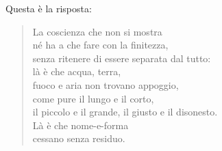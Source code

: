 Questa è la risposta:

\begin{quote}

\label{pag167}%
La coscienza che non si mostra \\
né ha a che fare con la finitezza, \\
senza ritenere di essere separata dal tutto: \\
là è che acqua, terra, \\
fuoco e aria non trovano appoggio, \\
come pure il lungo e il corto, \\
il piccolo e il grande, il giusto e il disonesto. \\
Là è che nome-e-forma \\
cessano senza residuo.

\end{quote}


